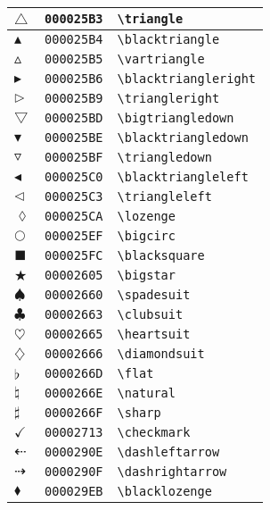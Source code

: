 \begin{longtable}{|l|l|l|}
\hline
$\triangle$ & \texttt{000025B3} & \verb|\triangle| \\
\hline
$\blacktriangle$ & \texttt{000025B4} & \verb|\blacktriangle| \\
\hline
$\vartriangle$ & \texttt{000025B5} & \verb|\vartriangle| \\
\hline
$\blacktriangleright$ & \texttt{000025B6} & \verb|\blacktriangleright| \\
\hline
$\triangleright$ & \texttt{000025B9} & \verb|\triangleright| \\
\hline
$\bigtriangledown$ & \texttt{000025BD} & \verb|\bigtriangledown| \\
\hline
$\blacktriangledown$ & \texttt{000025BE} & \verb|\blacktriangledown| \\
\hline
$\triangledown$ & \texttt{000025BF} & \verb|\triangledown| \\
\hline
$\blacktriangleleft$ & \texttt{000025C0} & \verb|\blacktriangleleft| \\
\hline
$\triangleleft$ & \texttt{000025C3} & \verb|\triangleleft| \\
\hline
$\lozenge$ & \texttt{000025CA} & \verb|\lozenge| \\
\hline
$\bigcirc$ & \texttt{000025EF} & \verb|\bigcirc| \\
\hline
$\blacksquare$ & \texttt{000025FC} & \verb|\blacksquare| \\
\hline
$\bigstar$ & \texttt{00002605} & \verb|\bigstar| \\
\hline
$\spadesuit$ & \texttt{00002660} & \verb|\spadesuit| \\
\hline
$\clubsuit$ & \texttt{00002663} & \verb|\clubsuit| \\
\hline
$\heartsuit$ & \texttt{00002665} & \verb|\heartsuit| \\
\hline
$\diamondsuit$ & \texttt{00002666} & \verb|\diamondsuit| \\
\hline
$\flat$ & \texttt{0000266D} & \verb|\flat| \\
\hline
$\natural$ & \texttt{0000266E} & \verb|\natural| \\
\hline
$\sharp$ & \texttt{0000266F} & \verb|\sharp| \\
\hline
$\checkmark$ & \texttt{00002713} & \verb|\checkmark| \\
\hline
$\dashleftarrow$ & \texttt{0000290E} & \verb|\dashleftarrow| \\
\hline
$\dashrightarrow$ & \texttt{0000290F} & \verb|\dashrightarrow| \\
\hline
$\blacklozenge$ & \texttt{000029EB} & \verb|\blacklozenge| \\

\end{longtable}
